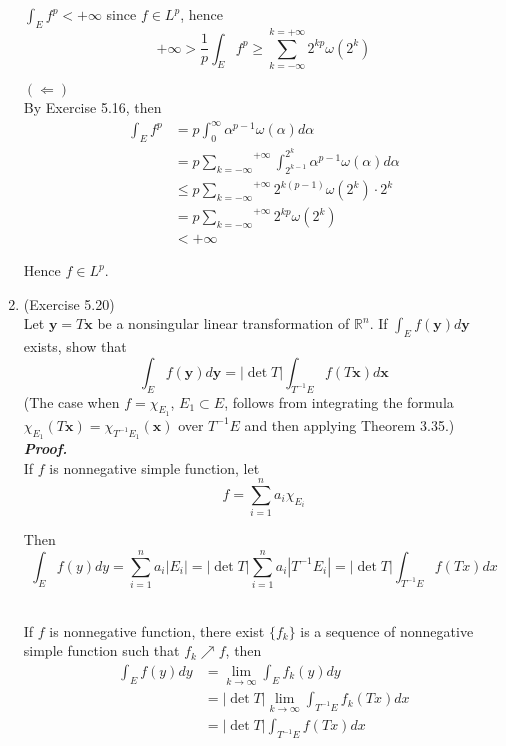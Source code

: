 \documentclass[a4paper,11pt]{article}
\begin{document}
\begin{enumerate}
 $\int_E f^p < +\infty$ since $f \in L^p$, hence
 $$+\infty > \frac{1}{p} \int_E f^p \geq \overset{k = +\infty}{\underset{k = -\infty}{\sum}} 2^{kp} \omega(2^k)$$



 $(\Leftarrow)$\\
 By Exercise 5.16, then
 $$\begin{aligned}
 \int_E f^p
 &= p \int_0^\infty \alpha^{p-1} \omega(\alpha) d \alpha\\
 &= p \overset{+\infty}{\underset{k = -\infty}{\sum}} \int_{2^{k-1}}^{2^k} \alpha^{p-1} \omega(\alpha) d \alpha\\
 &\leq p \overset{+\infty}{\underset{k = -\infty}{\sum}} 2^{k(p-1)} \omega(2^k) \cdot 2^k\\
 &= p \overset{+\infty}{\underset{k = -\infty}{\sum}} 2^{kp} \omega(2^k)\\
 &< +\infty
 \end{aligned}$$

 Hence $f \in L^p$.\\





\item (Exercise 5.20)\\
 Let $\mathbf{y} = T \mathbf{x}$ be a nonsingular linear transformation of $\mathbb{R}^n$. If $\int_{E} f(\mathbf{y}) d \mathbf{y}$ exists, show that
 $$\int_{E} f(\mathbf{y}) d \mathbf{y} = |\det T| \int_{T^{-1} E} f(T \mathbf{x}) d \mathbf{x}$$
 (The case when $f = \chi_{E_1}$, $E_1 \subset E$, follows from integrating the formula $\chi_{E_1} (T \mathbf{x}) = \chi_{T^{-1} E_1} (\mathbf{x})$ over $T^{-1}E$ and then applying Theorem 3.35.)\\
 \newline
 \textit{\textbf {Proof.}}\\

 If $f$ is nonnegative simple function, let
 $$f = \sum_{i = 1}^n a_i \chi_{E_i}$$

 Then
 $$\int_E f(y) dy
 = \sum_{i=1}^n a_i |E_i|
 = |\det T| \sum_{i=1}^n a_i |T^{-1} E_i|
 = |\det T| \int_{T^{-1} E} f(Tx) dx$$\

 If $f$ is nonnegative function, there exist $\{ f_k \}$ is a sequence of nonnegative simple function such that $f_k \nearrow f$, then
 $$\begin{aligned}
 \int_E f(y) dy
 &= \underset{k \to \infty}{\lim} \int_E f_k (y) dy\\
 &= |\det T| \underset{k \to \infty}{\lim} \int_{T^{-1} E} f_k (Tx) dx\\
 &= |\det T| \int_{T^{-1} E} f(Tx) dx
 \end{aligned}$$


\end{enumerate}
\end{document}
